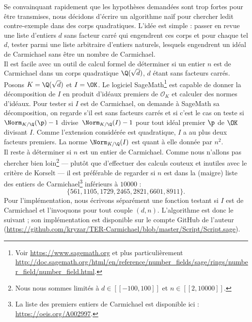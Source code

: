 \documentclass[a4paper, 12pt, oneside]{article}
\begin{document}
Se convainquant rapidement que les hypothèses demandées sont trop fortes pour être transmises, nous décidons d'écrire un algorithme naïf pour chercher ledit contre-exemple dans des corps quadratiques. L'idée est simple : passer en revue une liste d'entiers $d$ sans facteur carré qui engendrent ces corps et pour chaque tel $d$, tester parmi une liste arbitraire d'entiers naturels, lesquels engendrent un idéal de Carmichael sans être un nombre de Carmichael. \\

Il est facile avec un outil de calcul formel de déterminer si un entier $n$ est de Carmichael dans un corps quadratique $\Q(\sqrt{d})$, $d$ étant sans facteurs carrés. Posons $K=\Q(\sqrt{d})$ et $I = \OK$. Le logiciel SageMath\footnote{Voir \url{https://www.sagemath.org} et plus particulièrement \url{http://doc.sagemath.org/html/en/reference/number_fields/sage/rings/number_field/number_field.html}.} est capable de donner la décomposition de $I$ en produit d'idéaux premiers de $\mathcal{O}_K$ et calculer des normes d'idéaux. Pour tester si $I$ est de Carmichael, on demande à SageMath sa décomposition, on regarde s'il est sans facteurs carrés et si c'est le cas on teste si $\Norm_{K/\Q}(\p) - 1$ divise $\Norm_{K/\Q}(I) - 1$ pour tout idéal premier $\p$ de $\OK$ divisant $I$. Comme l'extension considérée est quadratique, $I$ a au plus deux facteurs premiers. La norme $\Norm_{K/\Q}(I)$ est quant à elle donnée par $n^2$. \\

Il reste à déterminer si $n$ est un entier de Carmichael. Comme nous n'allons pas chercher bien loin\footnote{Nous nous sommes limités à $d\in [\![-100, 100]\!]$ et $n\in [\![2, 10000]\!]$.} — plutôt que d'effectuer des calculs couteux et inutiles avec le critère de Korselt — il est préférable de regarder si $n$ est dans la (maigre) liste des entiers de Carmichael\footnote{La liste des premiers entiers de Carmichael est disponible ici : \url{https://oeis.org/A002997}.} inférieurs à $10000$ : $$\{561, 1105, 1729, 2465, 2821, 6601, 8911\}.$$ Pour l'implémentation, nous écrivons séparément une fonction testant si $I$ est de Carmichael et l'invoquons pour tout couple $(d, n)$. L'algorithme est donc le suivant ; son implémentation est disponible sur le compte GitHub de l'auteur (\url{https://github.com/kryzar/TER-Carmichael/blob/master/Script/Script.sage}).

\vspace{1em}
\begin{algorithm}[H]
\end{algorithm}
\vspace{1em}
\end{document}
